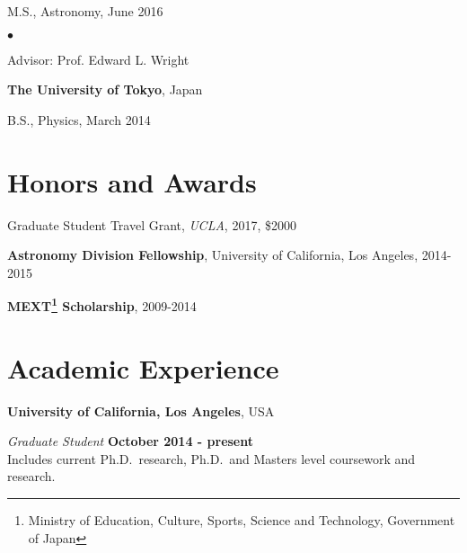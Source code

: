 \documentclass[margin,line]{res}
\newenvironment{list1}{
  \begin{list}{\ding{113}}{%
      \setlength{\itemsep}{0in}
      \setlength{\parsep}{0in} \setlength{\parskip}{0in}
      \setlength{\topsep}{0in} \setlength{\partopsep}{0in} 
      \setlength{\leftmargin}{0.17in}}}{\end{list}}
\newenvironment{list2}{
  \begin{list}{$\bullet$}{%
      \setlength{\itemsep}{0in}
      \setlength{\parsep}{0in} \setlength{\parskip}{0in}
      \setlength{\topsep}{0in} \setlength{\partopsep}{0in} 
      \setlength{\leftmargin}{0.2in}}}{\end{list}}
\begin{document}
\begin{resume}
\begin{list1}
\item[] M.S., Astronomy,  June 2016
\begin{list2}
\vspace*{.05in} 
\item Advisor:  Prof. Edward L. Wright
\end{list2}
\end{list1}

{\bf The University of Tokyo}, Japan\\
\vspace*{-.1in}
\begin{list1}
\item[] B.S., Physics,  March 2014
\end{list1}


\section{\sc Honors and Awards} 
Graduate Student Travel Grant, {\it UCLA}, 2017, \$2000

\vspace*{-2.5mm}
\textbf{Astronomy Division Fellowship}, University of California, Los Angeles, 2014-2015 

\vspace*{-2.5mm}
\textbf{MEXT\footnote{Ministry of Education, Culture, Sports, Science and Technology, Government of Japan} Scholarship}, 2009-2014
\section{\sc Academic Experience}
{\bf University of California, Los Angeles}, USA

\vspace{-.3cm}
{\em Graduate Student} \hfill {\bf October 2014 - present}\\
Includes current Ph.D.~research, Ph.D.~and Masters level coursework and
research.




\end{resume}
\end{document}
